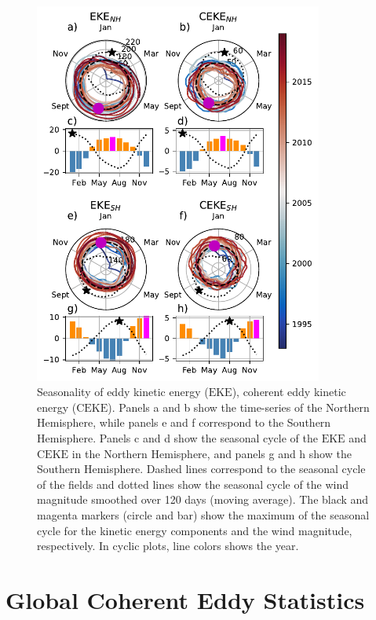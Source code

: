 \documentclass[draft,linenumbers]{agujournal2019}
\newcommand{\EKE}{\textrm{EKE}}
\newcommand{\CEKE}{\textrm{CEKE}}
\begin{document}
	\begin{figure}
	    \centering
	    \includegraphics[width=95mm]{figures/All_polar_plots.pdf}
	    \caption{Seasonality of eddy kinetic energy ($\EKE$), coherent eddy kinetic energy ($\CEKE$). 
		Panels a and b show the time-series of the Northern Hemisphere, while panels e and f correspond to the Southern Hemisphere. Panels c and d show the seasonal cycle of the $\EKE$ and $\CEKE$ in the Northern Hemisphere, and panels g and h show the Southern Hemisphere.
		Dashed lines correspond to the seasonal cycle of the fields and dotted lines show the seasonal cycle of the wind magnitude smoothed over 120 days (moving average). 
		The black and magenta markers (circle and bar) show the maximum of the seasonal cycle for the kinetic energy components and the wind magnitude, respectively. In cyclic plots, line colors shows the year.}
	    \label{fig:eddy_energy_polar}
	\end{figure}
	
	\section{Global Coherent Eddy Statistics}
	\label{sec:CE_stats}
\end{document}

